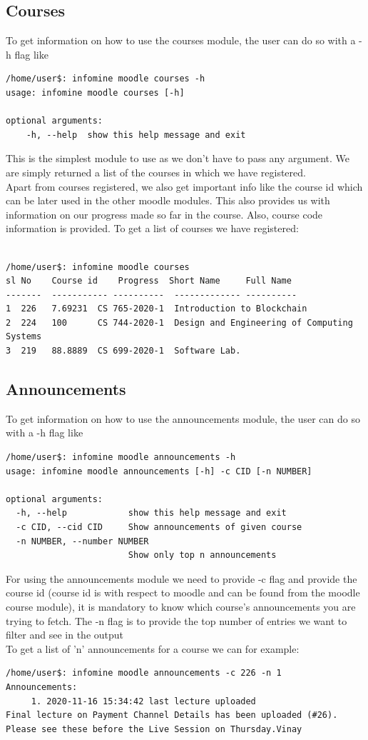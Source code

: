 \documentclass[12pt, letterpaper, twoside]{article}
\begin{document}
\subsection{Courses}
To get information on how to use the courses module, the user can do so with a -h flag like 
\begin{verbatim}
/home/user$: infomine moodle courses -h
usage: infomine moodle courses [-h]

optional arguments:
    -h, --help  show this help message and exit
\end{verbatim}
This is the simplest module to use as we don't have to pass any argument. We are simply returned a list of the courses in which we have registered.\\
Apart from courses registered, we also get important info like the course id which can be later used in the other moodle modules.
This also provides us with information on our progress made so far in the course.
Also, course code information is provided.
To get a list of courses we have registered:\\
\\
\begin{verbatim}
/home/user$: infomine moodle courses
sl No    Course id    Progress  Short Name     Full Name
-------  ----------- ----------  ------------- ----------
1  226   7.69231  CS 765-2020-1  Introduction to Blockchain
2  224   100      CS 744-2020-1  Design and Engineering of Computing Systems
3  219   88.8889  CS 699-2020-1  Software Lab.
\end{verbatim}

\subsection{Announcements}
To get information on how to use the announcements module, the user can do so with a -h flag like 
\begin{verbatim}
/home/user$: infomine moodle announcements -h
usage: infomine moodle announcements [-h] -c CID [-n NUMBER]

optional arguments:
  -h, --help            show this help message and exit
  -c CID, --cid CID     Show announcements of given course
  -n NUMBER, --number NUMBER
                        Show only top n announcements
\end{verbatim}
For using the announcements module we need to provide -c flag and provide the course id (course id is with respect to moodle and can be found from the moodle course module), it is mandatory to know which course's announcements you are trying to fetch. The -n flag is to provide the top number of entries we want to filter and see in the output\\
To get a list of 'n' announcements for a course we can for example:
\begin{verbatim}
/home/user$: infomine moodle announcements -c 226 -n 1
Announcements:
	 1. 2020-11-16 15:34:42 last lecture uploaded
Final lecture on Payment Channel Details has been uploaded (#26). 
Please see these before the Live Session on Thursday.Vinay
\end{verbatim}
\end{document}
